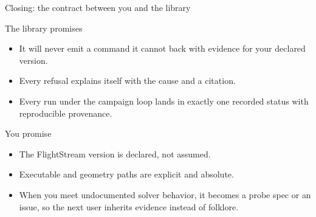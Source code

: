 \documentclass[aspectratio=169,10pt]{beamer}
\begin{document}
\begin{frame}{Closing: the contract between you and the library}
  \begin{block}{The library promises}
    \begin{itemize}
      \item It will never emit a command it cannot back with evidence for your declared version.
      \item Every refusal explains itself with the cause and a citation.
      \item Every run under the campaign loop lands in exactly one recorded status with reproducible provenance.
    \end{itemize}
  \end{block}
  \begin{block}{You promise}
    \begin{itemize}
      \item The FlightStream version is declared, not assumed.
      \item Executable and geometry paths are explicit and absolute.
      \item When you meet undocumented solver behavior, it becomes a probe spec or an issue, so the next user inherits evidence instead of folklore.
    \end{itemize}
  \end{block}
\end{frame}
\end{document}
